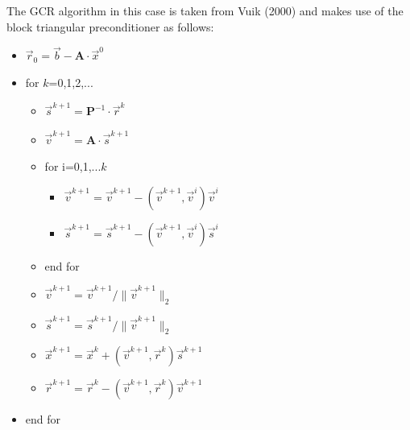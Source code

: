 The GCR algorithm \cite{eies83} in this case is taken from Vuik \etal (2000) \cite{vusb00}
and makes use of the block triangular preconditioner as follows:
\begin{itemize}
\item[] $\vec{r}_0 = \vec{b} - {\bm A}\cdot \vec{x}^0$
\item[] for $k$=0,1,2,...
\begin{itemize}
\item $\vec{s}^{k+1}={\bm P}^{-1} \cdot \vec{r}^k$
\item $\vec{v}^{k+1} = {\bm A}\cdot \vec{s}^{k+1}$
\item for i=0,1,...$k$
\begin{itemize}
\item $\vec{v}^{k+1}=\vec{v}^{k+1} - (\vec{v}^{k+1},\vec{v}^{i}) \vec{v}^i$
\item $\vec{s}^{k+1}=\vec{s}^{k+1} - (\vec{v}^{k+1},\vec{v}^{i}) \vec{s}^i$
\end{itemize}
\item end for
\item $\vec{v}^{k+1}=\vec{v}^{k+1} / \| \vec{v}^{k+1} \|_2$
\item $\vec{s}^{k+1}=\vec{s}^{k+1} / \| \vec{v}^{k+1} \|_2$  
\item $\vec{x}^{k+1} = \vec{x}^k + (\vec{v}^{k+1},\vec{r}^k) \vec{s}^{k+1} $
\item $\vec{r}^{k+1} = \vec{r}^k - (\vec{v}^{k+1}, \vec{r}^k) \vec{v}^{k+1}$
\end{itemize}
\item[] end for
\end{itemize}

